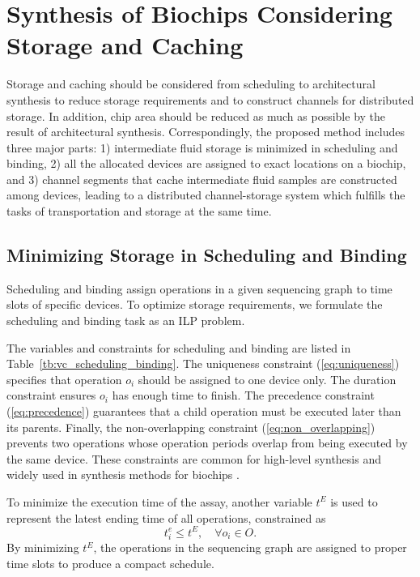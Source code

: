 
\section{Synthesis of Biochips Considering Storage and Caching}
\label{sec:storage_synthesis}

Storage and caching should be considered from scheduling to architectural synthesis
to reduce storage requirements and to construct channels for distributed
storage.
In addition, chip area should be reduced as much as possible by the result
of architectural synthesis.
Correspondingly, the proposed method includes three major parts:
1) intermediate fluid storage is minimized in scheduling and binding,
2) all the allocated devices are assigned to exact locations on a biochip, and 3) channel segments that cache intermediate fluid samples are constructed among devices, leading to a
distributed channel-storage system which fulfills the tasks of transportation and storage at the same time.

\subsection{Minimizing Storage in Scheduling and Binding}
\label{sec:scheduling_binding}

Scheduling and binding assign operations in a given sequencing graph
to time slots of specific devices.
To optimize storage requirements,
we formulate the scheduling and binding task as
an ILP problem. %

The variables and constraints for scheduling and binding are listed in
Table~\ref{tb:vc_scheduling_binding}. The uniqueness constraint (\ref{eq:uniqueness})
specifies that operation $o_i$ should be assigned
to one device only. The duration constraint ensures
$o_i$ has enough time to finish.
The precedence constraint (\ref{eq:precedence}) guarantees that a child
operation must be executed later than its parents. Finally, the
non-overlapping constraint (\ref{eq:non_overlapping}) prevents two operations
whose operation periods overlap from being executed by the same device.
These constraints are common for high-level synthesis and
widely used in synthesis methods for biochips \cite{SuCh04}.

To minimize the execution time of the assay, another variable $t^E$ is
used to represent
the latest ending time of all operations, constrained as
\begin{equation}\label{eq:latest_finishing}
t^e_i \le t^E,  \quad \forall o_i\in O.
\end{equation}
\vskip 7pt
By minimizing $t^E$, the operations in the sequencing graph
are assigned to proper time slots %
to produce a compact schedule.

